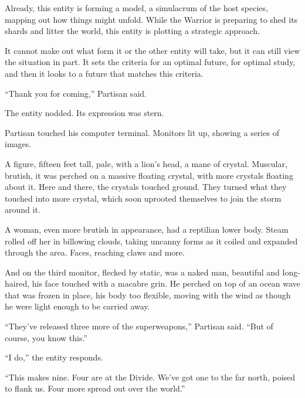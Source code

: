 Already, this entity is forming a model, a simulacrum of the host species, mapping out how things might unfold.  While the Warrior is preparing to shed its shards and litter the world, this entity is plotting a strategic approach.



It cannot make out what form it or the other entity will take, but it can still view the situation in part.  It sets the criteria for an optimal future, for optimal study, and then it looks to a future that matches this criteria.



\blacksquare



``Thank you for coming,'' Partisan said.



The entity nodded.  Its expression was stern.



Partisan touched his computer terminal.  Monitors lit up, showing a series of images.



A figure, fifteen feet tall, pale, with a lion's head, a mane of crystal.  Muscular, brutish, it was perched on a massive floating crystal, with more crystals floating about it. Here and there, the crystals touched ground.  They turned what they touched into more crystal, which soon uprooted themselves to join the storm around it.



A woman, even more brutish in appearance, had a reptilian lower body.  Steam rolled off her in billowing clouds, taking uncanny forms as it coiled and expanded through the area.  Faces, reaching claws and more.



And on the third monitor, flecked by static, was a naked man, beautiful and long-haired, his face touched with a macabre grin.  He perched on top of an ocean wave that was frozen in place, his body too flexible, moving with the wind as though he were light enough to be carried away.



``They've released three more of the superweapons,'' Partisan said.  ``But of course, you know this.''



``I do,'' the entity responds.



``This makes nine.  Four are at the Divide.  We've got one to the far north, poised to flank us.  Four more spread out over the world.''



